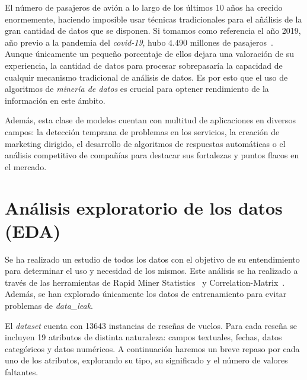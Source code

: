 \documentclass[es]{uc3mreport}
\begin{document}
\begin{report}
El número de pasajeros de avión a lo largo de los últimos 10 años ha crecido enormemente, haciendo imposible usar técnicas tradicionales para el añálisis de la gran cantidad de datos que se disponen. Si tomamos como referencia el año 2019, año previo a la pandemia del \textit{covid-19}, hubo $4.490$ millones de pasajeros~\cite{owd-passengers}. Aunque únicamente un pequeño porcentaje de ellos dejara una valoración de su experiencia, la cantidad de datos para procesar sobrepasaría la capacidad de cualquir mecanismo tradicional de análisis de datos. Es por esto que el uso de algoritmos de \textit{minería de datos} es crucial para optener rendimiento de la información en este ámbito.

Además, esta clase de modelos cuentan con multitud de aplicaciones en diversos campos: la detección temprana de problemas en los servicios, la creación de marketing dirigido, el desarrollo de algoritmos de respuestas automáticas o el análisis competitivo de compañías para destacar sus fortalezas y puntos flacos en el mercado.

\section{Análisis exploratorio de los datos (EDA)}
\label{chap:eda}
Se ha realizado un estudio de todos los datos con el objetivo de su entendimiento para determinar el uso y necesidad de los mismos. Este análisis se ha realizado a través de las herramientas de Rapid Miner Statistics~\cite{Statistics-RM} y Correlation-Matrix~\cite{Correlation-Matrix-RM}. Además, se han explorado únicamente los datos de entrenamiento para evitar problemas de \textit{data\_leak}. 

El \textit{dataset} cuenta con 13643 instancias de reseñas de vuelos. Para cada reseña se incluyen 19 atributos de distinta naturaleza: campos textuales, fechas, datos categóricos y datos numéricos. A continuación haremos un breve repaso por cada uno de los atributos, explorando su tipo, su significado y el número de valores faltantes.


\end{report}
\end{document}
